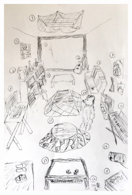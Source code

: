 \begin{figure}
    \centering
    \includegraphics[width=0.59\textwidth]{gazo/C12danwa.jpg}
\end{figure}

